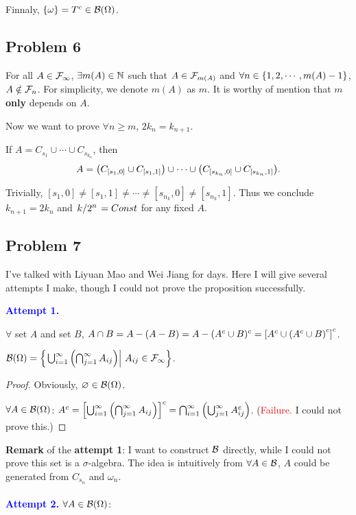 \documentclass{article}
\begin{document}
Finnaly, $\qty{\omega}=T^c\in\mathcal{B}(\Omega)$.


\subsection*{\centering Problem 6}

For all $A\in\mathcal{F}_\infty$,  $\exists m(A)\in\mathbb{N}$ such that $A\in\mathcal{F}_{m(A)}$ and  $\forall n\in\qty{1,2, \cdots, m(A)-1}$, $A\notin\mathcal{F}_n$. For simplicity, we denote  $m(A)$ as  $m$. It is worthy of mention that  $m$ \textbf{only} depends on  $A$.

Now we want to prove $\forall n\ge m$, $2{k_n}=k_{n+1}$.

If $A=C_{s_1}\cup\cdots\cup C_{s_{k_n}}$, then
\[
    A=
	\qty(C_{[s_1,0]}\cup C_{[s_1,1]})\cup\cdots\cup\qty(C_{[s_{k_n},0]}\cup C_{[s_{k_n},1]})
.\]

Trivially, $[s_1,0]\ne [s_1,1]\ne\cdots\ne[s_{n_k},0]\ne[s_{n_k},1]$. Thus we conclude $k_{n+1}=2k_n$ and  $\flatfrac{k}{2^n}=Const$ for any fixed  $A$.

\newpage
\subsection*{\centering Problem 7}
I've talked with Liyuan Mao and Wei Jiang for days. Here I will give several attempts I make, though I could not prove the proposition successfully.

\textcolor{blue}{\textbf{Attempt 1.}}
\begin{lemma}
	$\forall$ set $A$ and set $B$, $A\cap B=A-(A-B)=A-(A^c\cup B)^c=\qty[A^c\cup\qty(A^c\cup B)^c]^c$.
\end{lemma}
\begin{prp}
	$\+B(\Omega)=\set{\eval{\bigcup_{i=1}^\infty\qty(\bigcap_{j=1}^\infty A_{ij})}\, A_{ij}\in\+F_\infty}$.
\end{prp}
\begin{proof}
	Obviously, $\varnothing\in\mathcal{B}(\Omega)$.
	
	$\forall A\in\mathcal{B}(\Omega)$:
	$A^c=\qty[\bigcup_{i=1}^\infty\qty(\bigcap_{j=1}^\infty A_{ij})]^c=\bigcap_{i=1}^\infty\qty(\bigcup_{j=1}^\infty A_{ij}^c)$. (\textcolor{red}{Failure.} I could not prove this.)
\end{proof}

\textbf{Remark} of the \textbf{attempt 1}:
I want to construct $\mathcal{B}$ directly, while I could not prove this set is a  $\sigma$-algebra. The idea is intuitively from  $\forall A\in \mathcal{B}$, $A$ could be generated from  $C_{s_n}$ and  ${\omega_n}$.
\\
\\
\textcolor{blue}{\textbf{Attempt 2.}}
$\forall A\in\mathcal{B}(\Omega)$:
\end{document}
